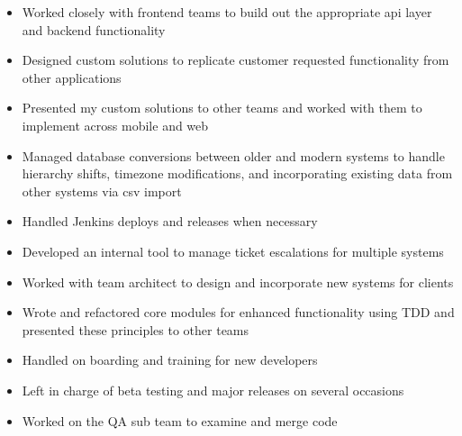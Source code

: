 \documentclass[10pt,a4paper,ragged2e]{altacv}
\begin{document}
\divider

\begin{itemize}
\item Worked closely with frontend teams to build out the appropriate api layer and backend functionality
\item Designed custom solutions to replicate customer requested functionality from other applications
\item Presented my custom solutions to other teams and worked with them to implement across mobile
and web
\item Managed database conversions between older and modern systems to handle hierarchy shifts,
timezone modifications, and incorporating existing data from other systems via csv import
\item Handled Jenkins deploys and releases when necessary
\end{itemize}

\divider

\begin{itemize}
\item Developed an internal tool to manage ticket escalations for multiple systems
\item Worked with team architect to design and incorporate new systems for clients
\item Wrote and refactored core modules for enhanced functionality using TDD and presented these principles to other teams
\item Handled on boarding and training for new developers
\item Left in charge of beta testing and major releases on several occasions
\item Worked on the QA sub team to examine and merge code
\end{itemize}

\divider
\end{document}
